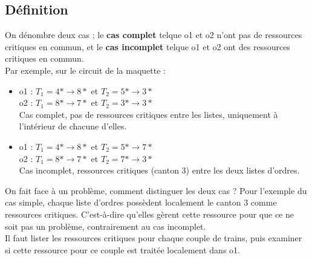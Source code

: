 \documentclass[12pt]{article}
\begin{document}
\subsection{Définition}
On dénombre deux cas ; le \textbf{cas complet} telque o1 et o2 n'ont pas de ressources critiques en commun,
et le \textbf{cas incomplet} telque o1 et o2 ont des ressources critiques en commun.
\vspace{0.5cm}\\
Par exemple, sur le circuit de la maquette :
\begin{itemize}
    \item o1 : $T_1 = 4* \rightarrow 8*$ et $T_2 = 5* \rightarrow 3*$ \\
          o2 : $T_1 = 8* \rightarrow 7*$ et $T_2 = 3* \rightarrow 3*$ \\
          Cas complet, pas de ressources critiques entre les listes, uniquement à l'intérieur de chacune d'elles.
    \item o1 : $T_1 = 4* \rightarrow 8*$ et $T_2 = 5* \rightarrow 7*$ \\
          o2 : $T_1 = 8* \rightarrow 7*$ et $T_2 = 7* \rightarrow 3*$ \\
          Cas incomplet, ressources critiques (canton 3) entre les deux listes d'ordres.
\end{itemize}
On fait face à un problème, comment distinguer les deux cas ? Pour l'exemple du cas simple,
chaque liste d'ordres possèdent localement le canton 3 comme ressources critiques. 
C'est-à-dire qu'elles gèrent cette ressource pour que ce ne soit pas un problème,
contrairement au cas incomplet.\\
Il faut lister les ressources critiques pour chaque couple de trains, puis examiner
si cette ressource pour ce couple est traitée localement dans o1.

\newpage
\end{document}
